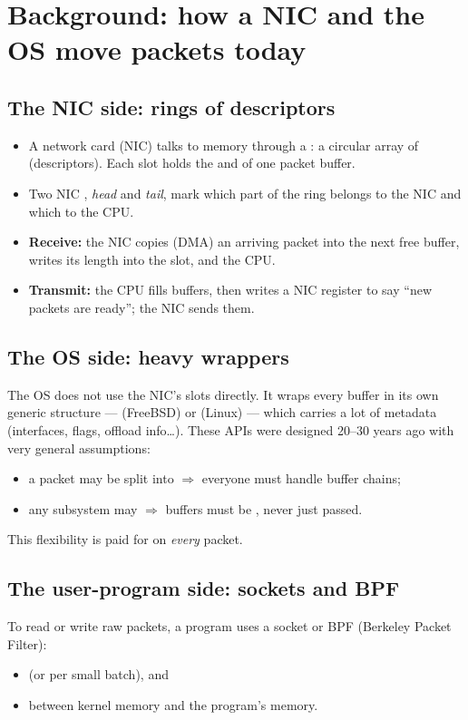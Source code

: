 \section{Background: how a NIC and the OS move packets today}
\subsection{The NIC side: rings of descriptors}
\begin{itemize}
\item A network card (NIC) talks to memory through a : a circular array of  (descriptors). Each slot holds the  and  of one packet buffer.
\item Two NIC , \emph{head} and \emph{tail}, mark which part of the ring belongs to the NIC and which to the CPU.
\item \textbf{Receive:} the NIC copies (DMA) an arriving packet into the next free buffer, writes its length into the slot, and  the CPU.
\item \textbf{Transmit:} the CPU fills buffers, then writes a NIC register to say ``new packets are ready''; the NIC sends them.
\end{itemize}

\subsection{The OS side: heavy wrappers}
The OS does not use the NIC's slots directly. It wraps every buffer in its own generic structure ---  (FreeBSD) or  (Linux) --- which carries a lot of metadata (interfaces, flags, offload info\ldots). These APIs were designed 20--30 years ago with very general assumptions:
\begin{itemize}
\item a packet may be split into  $\Rightarrow$ everyone must handle buffer chains;
\item any subsystem may  $\Rightarrow$ buffers must be , never just passed.
\end{itemize}
This flexibility is paid for on \emph{every} packet.

\subsection{The user-program side: sockets and BPF}
To read or write raw packets, a program uses a socket or BPF (Berkeley Packet Filter):
\begin{itemize}
\item {} (or per small batch), and
\item {} between kernel memory and the program's memory.
\end{itemize}

